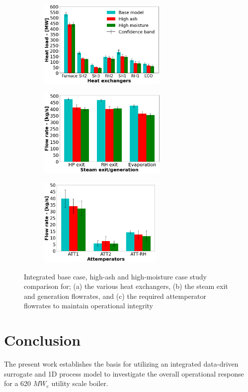 \documentclass[a4paper,fleqn]{cas-dc}
\begin{document}
\begin{figure}
\centering
\begin{subfigure}{0.33\textwidth}
    \includegraphics[width=\textwidth, height = 4.25cm]{100_FUEL_CASE}
    \caption{}
\end{subfigure}\hfill %
\begin{subfigure}{0.33\textwidth}
    \includegraphics[width=\linewidth, height = 4.25cm]{100_FUEL_CASE_STEAM}
    \caption{}
\end{subfigure}\hfill
\begin{subfigure}{0.33\textwidth}
    \includegraphics[width=\linewidth, height = 4.25cm]{100_FUEL_CASE_ATTEMP}
    \caption{}
\end{subfigure}
\caption{Integrated base case, high-ash and high-moisture case study comparison for; (a) the various heat exchangers, (b) the steam exit and generation flowrates, and (c) the required attemperator flowrates to maintain operational integrity}
\label{fig_fuel_results}
\end{figure}

\section{Conclusion}
The present work establishes the basis for utilizing an integrated data-driven surrogate and 1D process model to investigate the overall operational response for a 620 $MW_e$ utility scale boiler.\\
\end{document}
